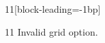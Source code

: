 \documentclass[paper=A4]{ropas-poster}
\begin{document}
\begin{postergrid}{1}{1}[block-leading=-1bp]
\begin{posterblock}{1}{1}
Invalid grid option.
\end{posterblock}
\end{postergrid}
\end{document}

